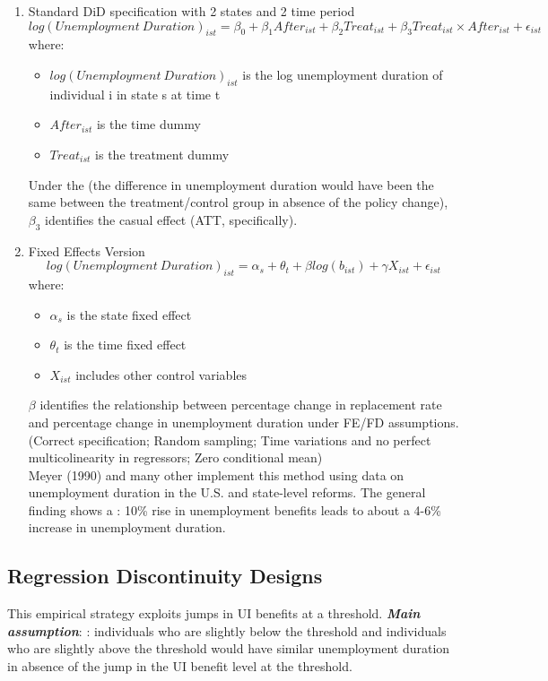         \begin{enumerate}
            \item Standard DiD specification with 2 states and 2 time period
            $$log(Unemployment\ Duration)_{ist} = \beta_0 + \beta_1 After_{ist} + \beta_2 Treat_{ist} + \beta_3 Treat_{ist} \times After_{ist} + \epsilon_{ist}$$
            where:
            \begin{itemize}
                \item $log(Unemployment\ Duration)_{ist}$ is the log unemployment duration of individual i in state s at time t
                \item $After_{ist}$ is the time dummy
                \item $Treat_{ist}$ is the treatment dummy
            \end{itemize}
            Under the  (the difference in unemployment duration would have been the same between the treatment/control group in absence of the policy change), $\beta_3$ identifies the casual effect (ATT, specifically).
            \item Fixed Effects Version\\
            $$log(Unemployment\ Duration)_{ist} = \alpha_s + \theta_t + \beta log(b_{ist}) + \gamma X_{ist} + \epsilon_{ist}$$
            where:
            \begin{itemize}
                \item $\alpha_s$ is the state fixed effect
                \item $\theta_t$ is the time fixed effect
                \item $X_{ist}$ includes other control variables
            \end{itemize}
            $\beta$ identifies the relationship between percentage change in replacement rate and percentage change in unemployment duration under FE/FD assumptions. (Correct specification; Random sampling; Time variations and no perfect multicolinearity in regressors; Zero conditional mean)\\
            Meyer (1990) and many other implement this method using data on unemployment duration in the U.S. and state-level reforms. The general finding shows a : 10\% rise in unemployment benefits leads to about a 4-6\% increase in unemployment duration.
        \end{enumerate}
            
    \subsection{Regression Discontinuity Designs}
        This empirical strategy exploits jumps in UI benefits at a threshold.
        \emph{\textbf{Main assumption}}: : individuals who are slightly below the threshold and individuals who are slightly above the threshold would have similar unemployment duration in absence of the jump in the UI benefit level at the threshold.
        

